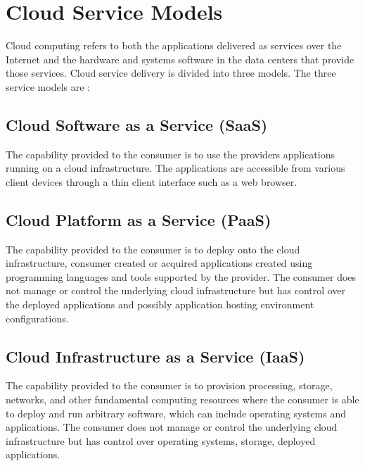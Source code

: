 \chapter{Cloud Service Models}
Cloud computing refers to both the applications delivered as services over the Internet and the hardware and systems software in the data centers that provide those services. Cloud service delivery is divided into three models. The three service models are \cite {citation-3} :

\section{Cloud Software as a Service (SaaS)}
The capability provided to the consumer is to use the providers applications running on a cloud
infrastructure. The applications are accessible from various client devices through a thin client
interface such as a web browser. 

\section{Cloud Platform as a Service (PaaS)}
The capability provided to the consumer is to deploy onto the cloud infrastructure, consumer
created or acquired applications created using programming languages and tools supported by the
provider. The consumer does not manage or control the underlying cloud infrastructure but has
control over the deployed applications and possibly application hosting environment
configurations.

\section{Cloud Infrastructure as a Service (IaaS)}
The capability provided to the consumer is to provision processing, storage, networks, and other
fundamental computing resources where the consumer is able to deploy and run arbitrary
software, which can include operating systems and applications. The consumer does not manage
or control the underlying cloud infrastructure but has control over operating systems, storage,
deployed applications.

